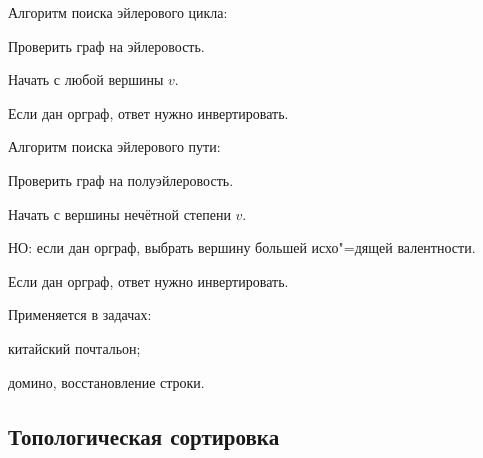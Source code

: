 {\bold Алгоритм} поиска эйлерового {\ital цикла}:


\begin{list*}[][\#]
\item Проверить граф на {\ital эйлеровость}.
\item Начать с любой вершины $v$.
\item Если дан орграф, ответ нужно {\ital инвертировать}.
\end{list*}

{\bold Алгоритм} поиска эйлерового {\ital пути}:


\begin{list*}[][\#]
\item Проверить граф на {\ital полуэйлеровость}.
\item Начать с вершины нечётной степени $v$.

{\bold НО:} если дан орграф, выбрать вершину большей {\ital исхо"=дящей} валентности.
\item Если дан орграф, ответ нужно {\ital инвертировать}.
\end{list*}

Применяется в {\bold задачах}:

\begin{list*}
\item китайский почтальон;
\item домино, восстановление строки.
\end{list*}

\subsection{Топологическая сортировка}

